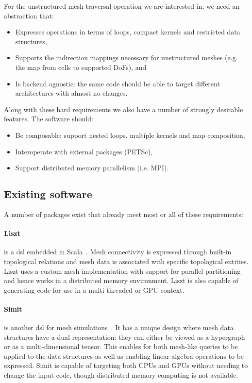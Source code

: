 \documentclass[thesis]{subfiles}
\begin{document}
For the unstructured mesh traversal operation we are interested in, we need an abstraction that:

\begin{itemize}
  \item
    Expresses operations in terms of loops, compact kernels and restricted data structures,
  \item
    Supports the indirection mappings necessary for unstructured meshes (e.g. the map from cells to supported DoFs), and
  \item
    Is backend agnostic: the same code should be able to target different architectures with almost no changes.
\end{itemize}

Along with these hard requirements we also have a number of strongly desirable features.
The software should:

\begin{itemize}
  \item
    Be composable: support nested loops, multiple kernels and map composition,

  \item
    Interoperate with external packages (PETSc),

  \item
    Support distributed memory parallelism (i.e. MPI).
\end{itemize}

\subsection{Existing software}

A number of packages exist that already meet most or all of these requirements:

\paragraph{Liszt}{
  is a \gls{dsl} embedded in Scala\footnotemark~\cite{devitoLisztDomainSpecific2011}.
  Mesh connectivity is expressed through built-in topological relations and mesh data is associated with specific topological entities.
  Liszt uses a custom mesh implementation with support for parallel partitioning and hence works in a distributed memory environment.
  Liszt is also capable of generating code for use in a multi-threaded or GPU context.
}

\paragraph{Simit}{
  is another \gls{dsl} for mesh simulations\footnotemark[\value{footnote}]~\cite{kjolstadSimitLanguagePhysical2016}.
  It has a unique design where mesh data structures have a dual representation: they can either be viewed as a hypergraph or as a multi-dimensional tensor.
  This enables for both mesh-like queries to be applied to the data structures as well as enabling linear algebra operations to be expressed.
  Simit is capable of targeting both CPUs and GPUs without needing to change the input code, though distributed memory computing is not available.
}
\end{document}
